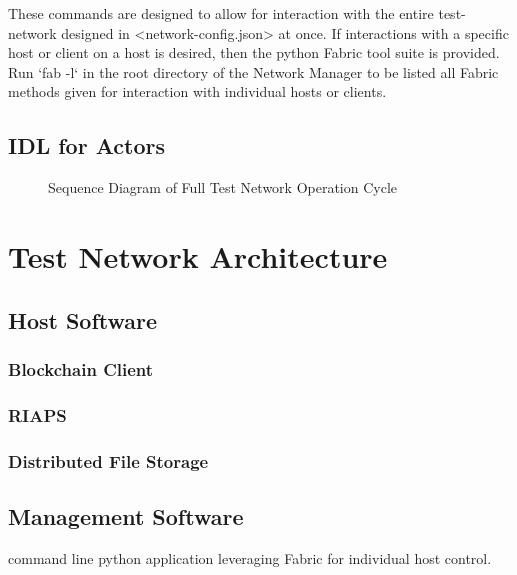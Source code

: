 \documentclass[]{article}
\begin{document}
These commands are designed to allow for interaction with the entire test-network designed in <network-config.json> at once. If interactions with a specific host or client on a host is desired, then the python Fabric tool suite is provided. Run `fab -l` in the root directory of the Network Manager to be listed all Fabric methods given for interaction with individual hosts or clients.











\subsection{IDL for Actors}











\begin{figure}
	\caption{Sequence Diagram of Full Test Network Operation Cycle}
	\label{fig:seqdiag:testnetworksetup}
\end{figure}


\section{Test Network Architecture}

\subsection{Host Software}

\subsubsection{Blockchain Client}

\subsubsection{RIAPS}

\subsubsection{Distributed File Storage}

\subsection{Management Software}

command line python application leveraging Fabric for individual host control.
\end{document}
